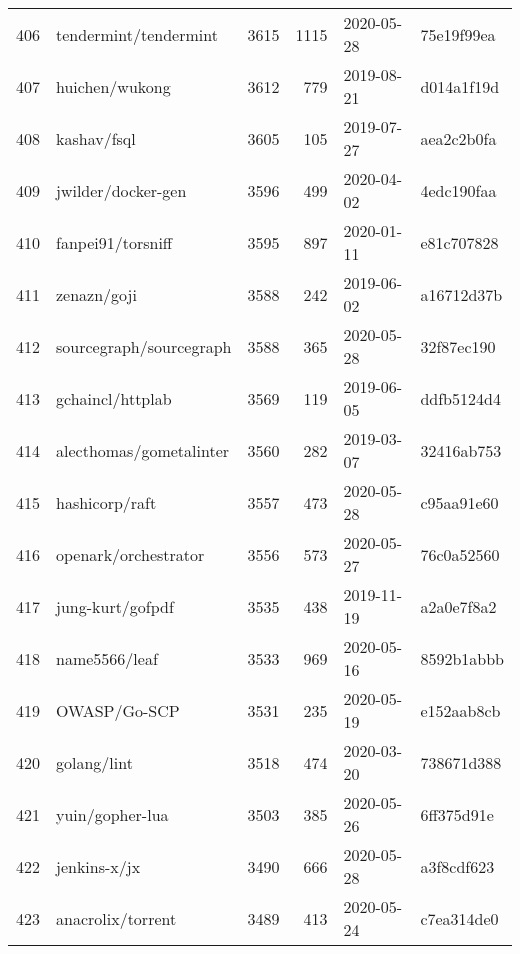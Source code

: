 \begin{longtable}{llrrll}
    406 &                              tendermint/tendermint &   3615 &   1115 & 2020-05-28 &  75e19f99ea \\
    407 &                                     huichen/wukong &   3612 &    779 & 2019-08-21 &  d014a1f19d \\
    408 &                                        kashav/fsql &   3605 &    105 & 2019-07-27 &  aea2c2b0fa \\
    409 &                                 jwilder/docker-gen &   3596 &    499 & 2020-04-02 &  4edc190faa \\
    410 &                                  fanpei91/torsniff &   3595 &    897 & 2020-01-11 &  e81c707828 \\
    411 &                                        zenazn/goji &   3588 &    242 & 2019-06-02 &  a16712d37b \\
    412 &                            sourcegraph/sourcegraph &   3588 &    365 & 2020-05-28 &  32f87ec190 \\
    413 &                                   gchaincl/httplab &   3569 &    119 & 2019-06-05 &  ddfb5124d4 \\
    414 &                            alecthomas/gometalinter &   3560 &    282 & 2019-03-07 &  32416ab753 \\
    415 &                                     hashicorp/raft &   3557 &    473 & 2020-05-28 &  c95aa91e60 \\
    416 &                               openark/orchestrator &   3556 &    573 & 2020-05-27 &  76c0a52560 \\
    417 &                                   jung-kurt/gofpdf &   3535 &    438 & 2019-11-19 &  a2a0e7f8a2 \\
    418 &                                      name5566/leaf &   3533 &    969 & 2020-05-16 &  8592b1abbb \\
    419 &                                       OWASP/Go-SCP &   3531 &    235 & 2020-05-19 &  e152aab8cb \\
    420 &                                        golang/lint &   3518 &    474 & 2020-03-20 &  738671d388 \\
    421 &                                    yuin/gopher-lua &   3503 &    385 & 2020-05-26 &  6ff375d91e \\
    422 &                                       jenkins-x/jx &   3490 &    666 & 2020-05-28 &  a3f8cdf623 \\
    423 &                                  anacrolix/torrent &   3489 &    413 & 2020-05-24 &  c7ea314de0 \\

\end{longtable}

